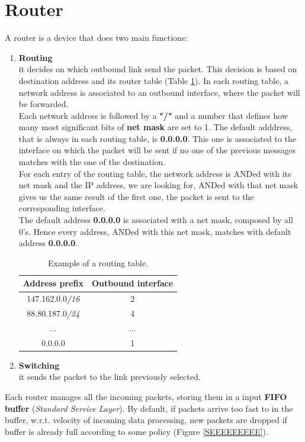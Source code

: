 \section{Router} \label{router_section}
A router is a device that does two main functions:
\begin{enumerate}
\item{\textbf{Routing}\\
it decides on which outbound link send the packet. This decision is based on destination address and its router table (Table \ref{routing_table}). In each routing table, a network address is associated to an outbound interface, where the packet will be forwarded.\\
Each network address is followed by a \textbf{"/"} and a number that defines how many most significant bits of \textbf{net mask} are set to 1. The default adddress, that is always in each routing table, is \textbf{0.0.0.0}. This one is associated to the interface on which the packet will be sent if no one of the previous messages matches with the one of the destination.\\
For each entry of the routing table, the network address is ANDed with its net mask and the IP address, we are looking for, ANDed with that net mask gives us the same result of the first one, the packet is sent to the corresponding interface.\\
The default address \textbf{0.0.0.0} is associated with a net mask, composed by all 0's. Hence every address, ANDed with this net mask, matches with default address \textbf{0.0.0.0}.
\begin{table}[h]
\centering \footnotesize
\begin{tabular}{|c|c|}
\hline
\textbf{Address prefix} & \textbf{Outbound interface}\\
\hline
{147.162.0.0\textit{/16}} & {2}\\
{88.80.187.0\textit{/24}} & {4}\\
{...} & {...}\\
{0.0.0.0} & {1}\\
\hline
\end{tabular}
\caption{Example of a routing table.}\label{routing_table}
\end{table}
}
\item{\textbf{Switching}\\
it sends the packet to the link previously selected.}
\end{enumerate}
Each router manages all the incoming packets, storing them in a input \textbf{FIFO buffer} (\textit{Standard Service Layer}). By default, if packets arrive too fast to in the buffer, w.r.t. velocity of incoming data processing, new packets are dropped if buffer is already full according to some policy (Figure \ref{SEEEEEEEEE}).\\
